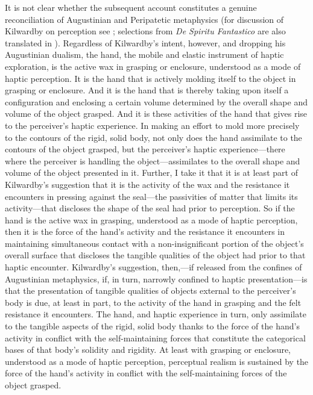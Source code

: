 It is not clear whether the subsequent account constitutes a genuine reconciliation of Augustinian and Peripatetic metaphysics (for discussion of Kilwardby on perception see \citealt{Silva:2008yg,Silva:2010zh}; selections from \emph{De Spiritu Fantastico} are also translated in \citealt{Knuuttila:2014rc}). Regardless of Kilwardby's intent, however, and dropping his Augustinian dualism, the hand, the mobile and elastic instrument of haptic exploration, is the active wax in grasping or enclosure, understood as a mode of haptic perception. It is the hand that is actively molding itself to the object in grasping or enclosure. And it is the hand that is thereby taking upon itself a configuration and enclosing a certain volume determined by the overall shape and volume of the object grasped. And it is these activities of the hand that gives rise to the perceiver's haptic experience. In making an effort to mold more precisely to the contours of the rigid, solid body, not only does the hand assimilate to the contours of the object grasped, but the perceiver's haptic experience---there where the perceiver is handling the object---assimilates to the overall shape and volume of the object presented in it. Further, I take it that it is at least part of Kilwardby's suggestion that it is the activity of the wax and the resistance it encounters in pressing against the seal---the passivities of matter that limits its activity---that discloses the shape of the seal had prior to perception. So if the hand is the active wax in grasping, understood as a mode of haptic perception, then it is the force of the hand's activity and the resistance it encounters in maintaining simultaneous contact with a non-insignificant portion of the object's overall surface that discloses the tangible qualities of the object had prior to that haptic encounter. Kilwardby's suggestion, then,---if released from the confines of Augustinian metaphysics, if, in turn, narrowly confined to haptic presentation---is that the presentation of tangible qualities of objects external to the perceiver's body is due, at least in part, to the activity of the hand in grasping and the felt resistance it encounters. The hand, and haptic experience in turn, only assimilate to the tangible aspects of the rigid, solid body thanks to the force of the hand's activity in conflict with the self-maintaining forces that constitute the categorical bases of that body's solidity and rigidity. At least with grasping or enclosure, understood as a mode of haptic perception, perceptual realism is sustained by the force of the hand’s activity in conflict with the self-maintaining forces of the object grasped.

